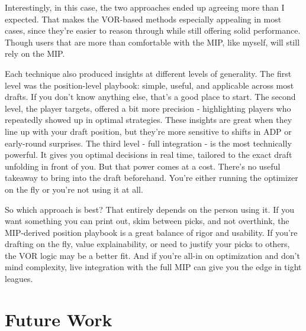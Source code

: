 \documentclass{article}
\begin{document}
Interestingly, in this case, the two approaches ended up agreeing more than I expected. 
That makes the VOR-based methods especially appealing in most cases, since they're easier to reason through while still offering solid performance.
Though users that are more than comfortable with the MIP, like myself, will still rely on the MIP. 

Each technique also produced insights at different levels of generality.
The first level was the position-level playbook: simple, useful, and applicable across most drafts. 
If you don't know anything else, that's a good place to start.
The second level, the player targets, offered a bit more precision - highlighting players who repeatedly showed up in optimal strategies. 
These insights are great when they line up with your draft position, but they're more sensitive to shifts in ADP or early-round surprises.
The third level - full integration - is the most technically powerful.
It gives you optimal decisions in real time, tailored to the exact draft unfolding in front of you.
But that power comes at a cost. There's no useful takeaway to bring into the draft beforehand.
You're either running the optimizer on the fly or you're not using it at all.

So which approach is best? That entirely depends on the person using it.
If you want something you can print out, skim between picks, and not overthink, the MIP-derived position playbook is a great balance of rigor and usability.
If you're drafting on the fly, value explainability, or need to justify your picks to others, the VOR logic may be a better fit.
And if you're all-in on optimization and don't mind complexity, live integration with the full MIP can give you the edge in tight leagues.


\section{Future Work}
\end{document}
